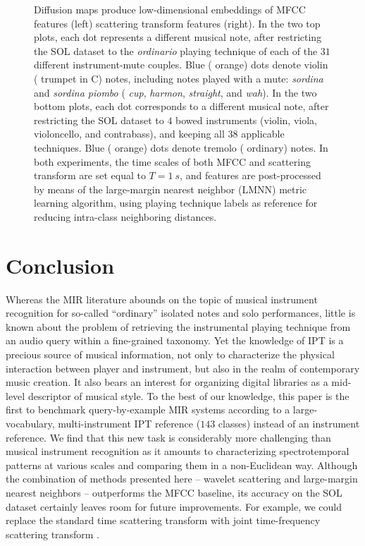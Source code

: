 \begin{figure}
        \caption{Diffusion maps produce low-dimensional embeddings of MFCC features (left) \vs{} scattering transform features (right).
In the two top plots, each dot represents a different musical note, after restricting the SOL dataset to the \emph{ordinario} playing technique of each of the $31$ different instrument-mute couples. Blue (\resp{} orange) dots denote violin (\resp{} trumpet in C) notes, including notes played with a mute: \emph{sordina} and \emph{sordina piombo} (\resp{} \emph{cup}, \emph{harmon}, \emph{straight}, and \emph{wah}).
In the two bottom plots, each dot corresponds to a different musical note, after restricting the SOL dataset to $4$ bowed instruments (violin, viola, violoncello, and contrabass), and keeping all $38$ applicable techniques. Blue (\resp{} orange) dots denote tremolo (\resp{} ordinary) notes.
In both experiments, the time scales of both MFCC and scattering transform are set equal to $T=\SI{1}{s}$, and features are post-processed by means of the large-margin nearest neighbor (LMNN) metric learning algorithm, using playing technique labels as reference for reducing intra-class neighboring distances.}
        \label{fig:embeddings}
\end{figure}



\section{Conclusion}

Whereas the MIR literature abounds on the topic of musical instrument recognition for so-called ``ordinary'' isolated notes and solo performances, little is known about the problem of retrieving the instrumental playing technique from an audio query within a fine-grained taxonomy.
Yet the knowledge of IPT is a precious source of musical information, not only to characterize the physical interaction between player and instrument, but also in the realm of contemporary music creation.
It also bears an interest for organizing digital libraries as a mid-level descriptor of musical style.
To the best of our knowledge, this paper is the first to benchmark query-by-example MIR systems according to a large-vocabulary, multi-instrument IPT reference ($143$ classes) instead of an instrument reference.
We find that this new task is considerably more challenging than musical instrument recognition as it amounts to characterizing spectrotemporal patterns at various scales and comparing them in a non-Euclidean way.
Although the combination of methods presented here -- wavelet scattering and large-margin nearest neighbors -- outperforms the MFCC baseline, its accuracy on the SOL dataset certainly leaves room for future improvements.
For example, we could replace the standard time scattering transform with
joint time-frequency scattering transform \cite{anden2018tsp}.

